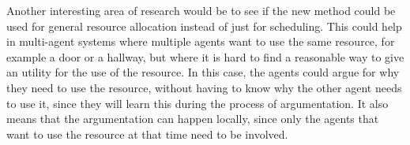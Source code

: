 Another interesting area of research would be to see if the new method
could be used for general resource allocation instead of just for
scheduling. This could help in multi-agent systems where multiple agents
want to use the same resource, for example a door or a hallway, but where
it is hard to find a reasonable way to give an utility for the use of the
resource. In this case, the agents could argue for why they need to use the
resource, without having to know why the other agent needs to use it, since
they will learn this during the process of argumentation. It also means
that the argumentation can happen locally, since only the agents that want
to use the resource at that time need to be involved.
